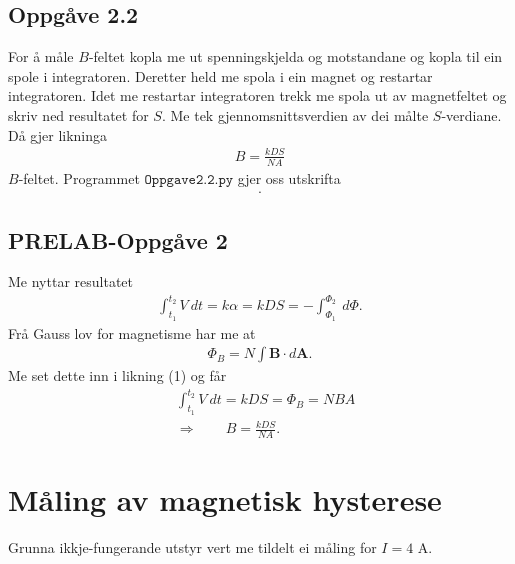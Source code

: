 \documentclass[11pt, a4paper]{article}
\newcommand{\vb}{\mathbf}
\begin{document}
  \subsection*{Oppgåve 2.2}
    For å måle $B$-feltet kopla me ut spenningskjelda og motstandane og kopla til ein spole i integratoren. Deretter held me spola i ein magnet og restartar integratoren. Idet me 
    restartar integratoren trekk me spola ut av magnetfeltet og skriv ned resultatet for $S$. Me tek gjennomsnittsverdien av dei målte $S$-verdiane. Då gjer likninga
    \begin{align*}
      B = \frac{kDS}{NA}
    \end{align*}
    $B$-feltet. Programmet $\texttt{Oppgave2.2.py}$ gjer oss utskrifta
    \begin{align*}
      .
    \end{align*}

  \subsection*{PRELAB-Oppgåve 2}
    Me nyttar resultatet
    \begin{align}
      \int_{t_1}^{t_2}V\ dt = k\alpha = kDS = -\int_{\Phi_1}^{\Phi_2} \ d\Phi.
    \end{align}
    Frå Gauss lov for magnetisme har me at
    \begin{align*}
      \Phi_B = N\int\vb{B} \cdot d\vb{A}.
    \end{align*}
    Me set dette inn i likning (1) og får
    \begin{align*}
      &\int_{t_1}^{t_2}V \ dt = kDS = \Phi_B = NBA \\ 
      &\Rightarrow \qquad B = \frac{kDS}{NA}.
    \end{align*}



\newpage


\section*{Måling av magnetisk hysterese}
  Grunna ikkje-fungerande utstyr vert me tildelt ei måling for $I = 4$ A.
\end{document}
